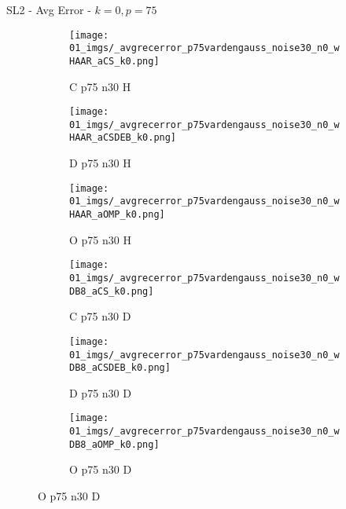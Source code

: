 \begin{frame}{SL2 - Avg Error - $k=0,p=75$}{}
\begin{figure}
\vspace{5pt}

\begin{subfigure}{0.13\textwidth}
\texttt{[image: 01\_imgs/\_avgrecerror\_p75vardengauss\_noise30\_n0\_wHAAR\_aCS\_k0.png]}
\caption*{\tiny C p75 n30 H}
\end{subfigure}
\begin{subfigure}{0.13\textwidth}
\texttt{[image: 01\_imgs/\_avgrecerror\_p75vardengauss\_noise30\_n0\_wHAAR\_aCSDEB\_k0.png]}
\caption*{\tiny D p75 n30 H}
\end{subfigure}
\begin{subfigure}{0.13\textwidth}
\texttt{[image: 01\_imgs/\_avgrecerror\_p75vardengauss\_noise30\_n0\_wHAAR\_aOMP\_k0.png]}
\caption*{\tiny O p75 n30 H}
\end{subfigure}
\begin{subfigure}{0.13\textwidth}
\texttt{[image: 01\_imgs/\_avgrecerror\_p75vardengauss\_noise30\_n0\_wDB8\_aCS\_k0.png]}
\caption*{\tiny C p75 n30 D}
\end{subfigure}
\begin{subfigure}{0.13\textwidth}
\texttt{[image: 01\_imgs/\_avgrecerror\_p75vardengauss\_noise30\_n0\_wDB8\_aCSDEB\_k0.png]}
\caption*{\tiny D p75 n30 D}
\end{subfigure}
\begin{subfigure}{0.13\textwidth}
\texttt{[image: 01\_imgs/\_avgrecerror\_p75vardengauss\_noise30\_n0\_wDB8\_aOMP\_k0.png]}
\caption*{\tiny O p75 n30 D}
\end{subfigure}
\end{figure}
\end{frame}


